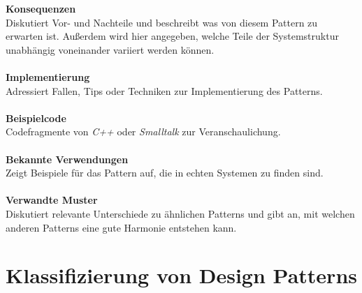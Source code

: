 \documentclass[fontsize=11pt,a4paper,final]{scrreprt}[2003/01/01]
\begin{document}
\textbf{Konsequenzen} \\
Diskutiert Vor- und Nachteile und beschreibt was von diesem Pattern zu erwarten ist. Außerdem wird hier angegeben, welche Teile der Systemstruktur unabhängig voneinander variiert werden können. \\ \\
\textbf{Implementierung} \\
Adressiert Fallen, Tips oder Techniken zur Implementierung des Patterns. \\ \\
\textbf{Beispielcode} \\
Codefragmente von \textit{C++} oder \textit{Smalltalk} zur Veranschaulichung. \\ \\
\textbf{Bekannte Verwendungen} \\
Zeigt Beispiele für das Pattern auf, die in echten Systemen zu finden sind. \\ \\
\textbf{Verwandte Muster} \\
Diskutiert relevante Unterschiede zu ähnlichen Patterns und gibt an, mit welchen anderen Patterns eine gute Harmonie entstehen kann.
\section{Klassifizierung von Design Patterns}\label{se:Klassifizierung}
\end{document}
